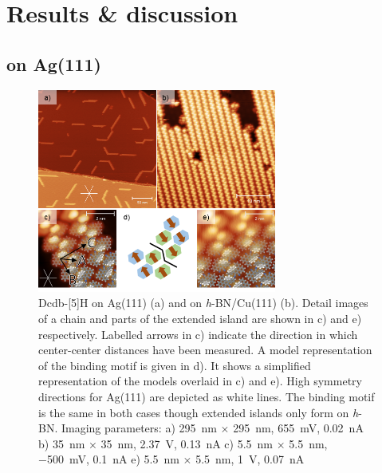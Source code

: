 \section{Results \& discussion}
\subsection{on Ag(111)}
\begin{figure} \centering
	\includegraphics[width=0.7\textwidth]{./images/paper/helicene/fig2}
	\caption{Dcdb-[5]H on Ag(111) (a) and on \textit{h}-BN/Cu(111) (b). Detail images of a chain and parts of the extended island are shown in c) and e) respectively. Labelled arrows in c) indicate the direction in which center-center distances have been measured. A model representation of the binding motif is given in d). It shows a simplified representation of the models overlaid in c) and e). High symmetry directions for Ag(111) are depicted as white lines. The binding motif is the same in both cases though extended islands only form on \textit{h}-BN. Imaging parameters: 
		a) %
		\SI{295}{\nano \meter} $\times$ \SI{295}{\nano \meter},
		\SI{655}{\milli \volt}, \SI{0.02}{\nano \ampere} 
		b) %
		\SI{35}{\nano \meter} $\times$ \SI{35}{\nano \meter},
		\SI{2.37}{\volt}, \SI{0.13}{\nano \ampere}
		c) %
		\SI{5.5}{\nano \meter} $\times$ \SI{5.5}{\nano \meter},
		\SI{-500}{\milli \volt}, \SI{0.1}{\nano \ampere}
		e) %
		\SI{5.5}{\nano \meter} $\times$ \SI{5.5}{\nano \meter},
		\SI{1}{\volt}, \SI{0.07}{\nano \ampere}
	}
	\label{fig:hel-fig2}
\end{figure}

